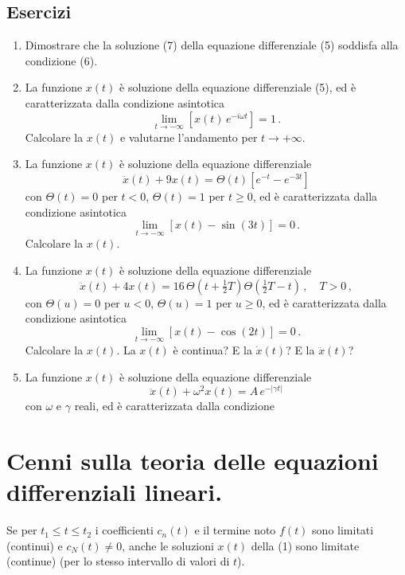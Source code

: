 \documentclass[11pt, a4paper]{book}
\numberwithin{equation}{section}
\newenvironment{esercizi}{\subsection*{Esercizi}\begin{enumerate}}{\end{enumerate}}
\begin{document}
\begin{esercizi}
    \item Dimostrare che la soluzione (7) della equazione differenziale (5)
    soddisfa alla condizione (6).
    \item La funzione $x(t)$ è soluzione della equazione differenziale (5), ed
    è caratterizzata dalla condizione asintotica
    \[
        \lim_{t \to -\infty} \left[ x(t) \, e^{-i\omega t} \right] = 1 \,.
    \]
    Calcolare la $x(t)$ e valutarne l'andamento per $t \to +\infty$.
    \item La funzione $x(t)$ è soluzione della equazione differenziale
    \[
        \ddot{x}(t) + 9 x(t) = \Theta(t) \left[ e^{-t} - e^{-3t} \right]
    \]
    con $\Theta(t) = 0$ per $t < 0$, $\Theta(t) = 1$ per $t \geq 0$, ed è
    caratterizzata dalla condizione asintotica
    \[
        \lim_{t \to -\infty} \left[ x(t) - \sin(3t) \right] = 0 \,.
    \]
    Calcolare la $x(t)$.
    \item La funzione $x(t)$ è soluzione della equazione differenziale
    \[
        \ddot{x}(t) + 4x(t) = 16 \, \Theta\!\left(t+\tfrac{1}{2}T\right) \Theta\!\left(\tfrac{1}{2}T-t\right) \,, \quad T > 0 \,,
    \]
    con $\Theta(u) = 0$ per $u < 0$, $\Theta(u) = 1$ per $u \geq 0$, ed è
    caratterizzata dalla condizione asintotica
    \[
        \lim_{t \to -\infty} \left[ x(t) - \cos(2t) \right] = 0 \,.
    \]
    Calcolare la $x(t)$. La $x(t)$ è continua? E la $\dot{x}(t)$? E la $\ddot{x}(t)$?
    \item La funzione $x(t)$ è soluzione della equazione differenziale
    \[
        \ddot{x}(t) + \omega^2 x(t) = A \, e^{-|\gamma t|}
    \]
    con $\omega$ e $\gamma$ reali, ed è caratterizzata dalla condizione
\end{esercizi}


\section{Cenni sulla teoria delle equazioni differenziali lineari.}


Se per $t_1 \leq t \leq t_2$ i coefficienti $c_n(t)$ e il termine noto $f(t)$ sono limitati
(continui) e $c_N(t) \neq 0$, anche le soluzioni $x(t)$ della (1) sono limitate
(continue) (per lo stesso intervallo di valori di $t$).
\end{document}
